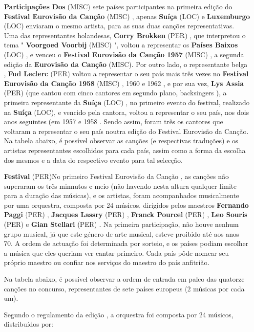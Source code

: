 \documentclass[12pt,a4paper]{article}
\begin{document}
\textbf{Participações Dos} (MISC) sete países participantes na primeira edição do \textbf{Festival Eurovisão da Canção} (MISC) , apenas \textbf{Suíça} (LOC) e \textbf{Luxemburgo} (LOC) enviaram o mesmo artista, para as suas duas canções representativas. Uma das representantes holandesas, \textbf{Corry Brokken} (PER) , que interpretou o tema " \textbf{Voorgoed Voorbij} (MISC) ", voltou a representar os \textbf{Países Baixos} (LOC) , e venceu o \textbf{Festival Eurovisão da Canção 1957} (MISC) , a segunda edição da \textbf{Eurovisão da Canção} (MISC). Por outro lado, o representante belga , \textbf{Fud Leclerc} (PER) voltou a representar o seu país mais três vezes no \textbf{Festival Eurovisão da Canção 1958} (MISC) , 1960 e 1962 , e por sua vez, \textbf{Lys Assia} (PER) (que cantou com cinco cantores em segundo plano, backsingers ), a primeira representante da \textbf{Suíça} (LOC) , no primeiro evento do festival, realizado na \textbf{Suíça} (LOC), e vencido pela cantora, voltou a representar o seu país, nos dois anos seguintes (em 1957 e 1958 . Sendo assim, foram três os cantores que voltaram a representar o seu país noutra edição do Festival Eurovisão da Canção. Na tabela abaixo, é possível observar as canções (e respectivas traduções) e os artistas representantes escolhidos para cada país, assim como a forma da escolha dos mesmos e a data do respectivo evento para tal selecção.



\textbf{Festival} (PER)No primeiro Festival Eurovisão da Canção , as canções não superaram os três minnutos e meio (não havendo nesta altura qualquer limite para a duração das músicas), e os artistas, foram acompanhados musicalmente por uma orquestra, composta por 24 músicos, dirigidos pelos maestros \textbf{Fernando Paggi} (PER) , \textbf{Jacques Lassry} (PER) , \textbf{Franck Pourcel} (PER) , \textbf{Leo Souris} (PER) e \textbf{Gian Stellari} (PER) . Na primeira participação, não houve nenhum grupo musical, já que este género de arte musical, esteve proibido até aos anos 70. A ordem de actuação foi determinada por sorteio, e os países podiam escolher a música que eles queriam ver cantar primeiro. Cada país pôde nomear seu próprio maestro ou confiar nos serviços do maestro do país anfitrião.

Na tabela abaixo, é possível observar a ordem de entrada em palco das quatorze canções no concurso, representantes de sete países europeus (2 músicas por cada um).

Segundo o regulamento da edição , a orquestra foi composta por 24 músicos, distribuídos por:
\end{document}
